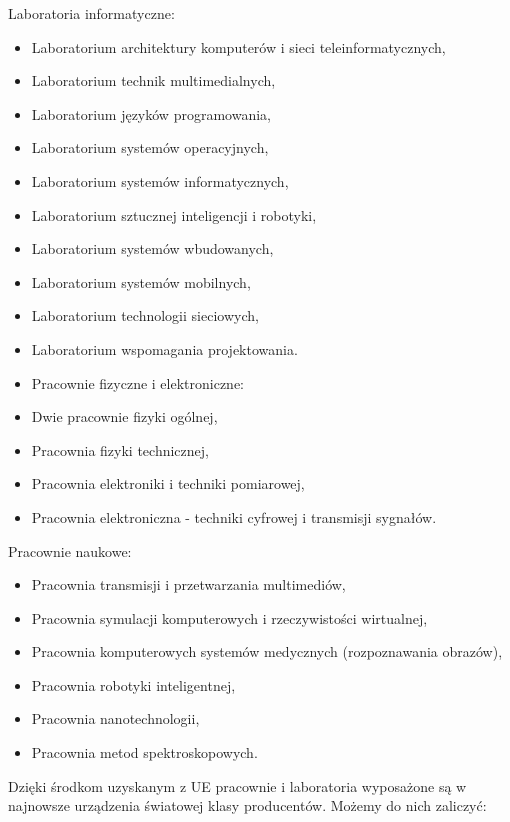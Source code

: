 ﻿\documentclass[a4paper,12pt]{article}
\begin{document}
Laboratoria informatyczne:
\begin{itemize}
\item Laboratorium architektury komputerów i sieci teleinformatycznych,
\item Laboratorium technik multimedialnych,
\item Laboratorium języków programowania,
\item Laboratorium systemów operacyjnych,
\item Laboratorium systemów informatycznych,
\item Laboratorium sztucznej inteligencji i robotyki,
\item Laboratorium systemów wbudowanych,
\item Laboratorium systemów mobilnych,
\item Laboratorium technologii sieciowych,
\item Laboratorium wspomagania projektowania.
\item Pracownie fizyczne i elektroniczne:
\item Dwie pracownie fizyki ogólnej,
\item Pracownia fizyki technicznej,
\item Pracownia elektroniki i techniki pomiarowej,
\item Pracownia elektroniczna - techniki cyfrowej i transmisji sygnałów.
\end{itemize}
Pracownie naukowe:
\begin{itemize}
\item Pracownia transmisji i przetwarzania multimediów,
\item Pracownia symulacji komputerowych i rzeczywistości wirtualnej,
\item Pracownia komputerowych systemów medycznych (rozpoznawania obrazów),
\item Pracownia robotyki inteligentnej,
\item Pracownia nanotechnologii,
\item Pracownia metod spektroskopowych.
\end{itemize}
Dzięki środkom uzyskanym z UE pracownie i laboratoria
 wyposażone są w najnowsze urządzenia światowej
klasy producentów. Możemy do nich zaliczyć:
\end{document}
